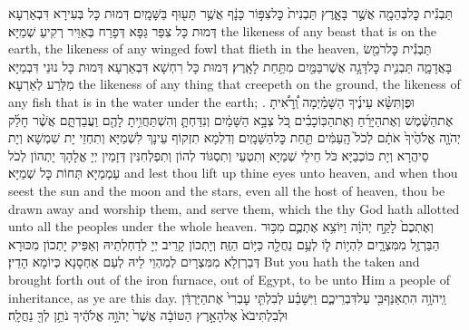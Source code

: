 {תַּבְנִ֕ית כׇּל\maqqaf בְּהֵמָ֖ה אֲשֶׁ֣ר בָּאָ֑רֶץ תַּבְנִית֙ כׇּל\maqqaf צִפּ֣וֹר כָּנָ֔ף אֲשֶׁ֥ר תָּע֖וּף בַּשָּׁמָֽיִם׃}
{דְּמוּת כָּל בְּעִירָא דִּבְאַרְעָא דְּמוּת כָּל צִפַּר גַּפָּא דְּפָרַח בְּאַוֵּיר רְקִיעַ שְׁמַיָּא׃}
{the likeness of any beast that is on the earth, the likeness of any winged fowl that flieth in the heaven,}{}
{תַּבְנִ֕ית כׇּל\maqqaf רֹמֵ֖שׂ בָּאֲדָמָ֑ה תַּבְנִ֛ית כׇּל\maqqaf דָּגָ֥ה אֲשֶׁר\maqqaf בַּמַּ֖יִם מִתַּ֥חַת לָאָֽרֶץ׃}
{דְּמוּת כָּל רִחְשָׁא דִּבְאַרְעָא דְּמוּת כָּל נוּנֵי דִּבְמַיָּא מִלְּרַע לְאַרְעָא׃}
{the likeness of any thing that creepeth on the ground, the likeness of any fish that is in the water under the earth; .}{}
{וּפֶן\maqqaf תִּשָּׂ֨א עֵינֶ֜יךָ הַשָּׁמַ֗יְמָה וְֽ֠רָאִ֠יתָ אֶת\maqqaf הַשֶּׁ֨מֶשׁ וְאֶת\maqqaf הַיָּרֵ֜חַ וְאֶת\maqqaf הַכּֽוֹכָבִ֗ים כֹּ֚ל צְבָ֣א הַשָּׁמַ֔יִם וְנִדַּחְתָּ֛ וְהִשְׁתַּחֲוִ֥יתָ לָהֶ֖ם וַעֲבַדְתָּ֑ם אֲשֶׁ֨ר חָלַ֜ק יְהֹוָ֤ה אֱלֹהֶ֙יךָ֙ אֹתָ֔ם לְכֹל֙ הָֽעַמִּ֔ים תַּ֖חַת כׇּל\maqqaf הַשָּׁמָֽיִם׃}
{וְדִלְמָא תִזְקוֹף עֵינָךְ לִשְׁמַיָּא וְתִחְזֵי יָת שִׁמְשָׁא וְיָת סֵיהֲרָא וְיָת כּוֹכְבַיָּא כֹּל חֵילֵי שְׁמַיָּא וְתִטְעֵי וְתִסְגּוֹד לְהוֹן וְתִפְלְחִנִּין דְּזָמֵין יְיָ אֱלָהָךְ יָתְהוֹן לְכֹל עַמְמַיָּא תְּחוֹת כָּל שְׁמַיָּא׃}
{and lest thou lift up thine eyes unto heaven, and when thou seest the sun and the moon and the stars, even all the host of heaven, thou be drawn away and worship them, and serve them, which the \lord\space thy God hath allotted unto all the peoples under the whole heaven.}{}
{וְאֶתְכֶם֙ לָקַ֣ח יְהֹוָ֔ה וַיּוֹצִ֥א אֶתְכֶ֛ם מִכּ֥וּר הַבַּרְזֶ֖ל מִמִּצְרָ֑יִם לִהְי֥וֹת ל֛וֹ לְעַ֥ם נַחֲלָ֖ה כַּיּ֥וֹם הַזֶּֽה׃}
{וְיָתְכוֹן קָרֵיב יְיָ לְדַחְלְתֵיהּ וְאַפֵּיק יָתְכוֹן מִכּוּרָא דְּבַרְזְלָא מִמִּצְרָיִם לְמִהְוֵי לֵיהּ לְעַם אַחְסָנָא כְּיוֹמָא הָדֵין׃}
{But you hath the \lord\space taken and brought forth out of the iron furnace, out of Egypt, to be unto Him a people of inheritance, as ye are this day.}{}
{וַֽיהֹוָ֥ה הִתְאַנַּף\maqqaf בִּ֖י עַל\maqqaf דִּבְרֵיכֶ֑ם וַיִּשָּׁבַ֗ע לְבִלְתִּ֤י עׇבְרִי֙ אֶת\maqqaf הַיַּרְדֵּ֔ן וּלְבִלְתִּי\maqqaf בֹא֙ אֶל\maqqaf הָאָ֣רֶץ הַטּוֹבָ֔ה אֲשֶׁר֙ יְהֹוָ֣ה אֱלֹהֶ֔יךָ נֹתֵ֥ן לְךָ֖ נַחֲלָֽה׃}
